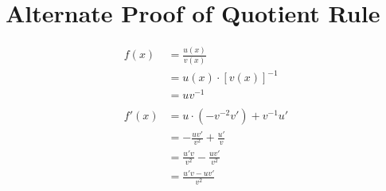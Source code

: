 \documentclass[letterpaper, landscape]{exam}
\begin{document}
  \section{Alternate Proof of Quotient Rule} %
  
  \begin{align*}
    f(x)  & = \frac{u(x)}{v(x)} \\
          & = u(x) \cdot [ v(x) ]^{-1} \\
          & = uv^{-1} \\
    \\
    f'(x) & = u \cdot (- v^{-2} v') + v^{-1} u' \\
          & = - \frac{uv'}{v^2} + \frac{u'}{v} \\
          & = \frac{u'v}{v^2} - \frac{uv'}{v^2} \\
          & = \frac{u'v - uv'}{v^2} \\
  \end{align*}
\end{document}
